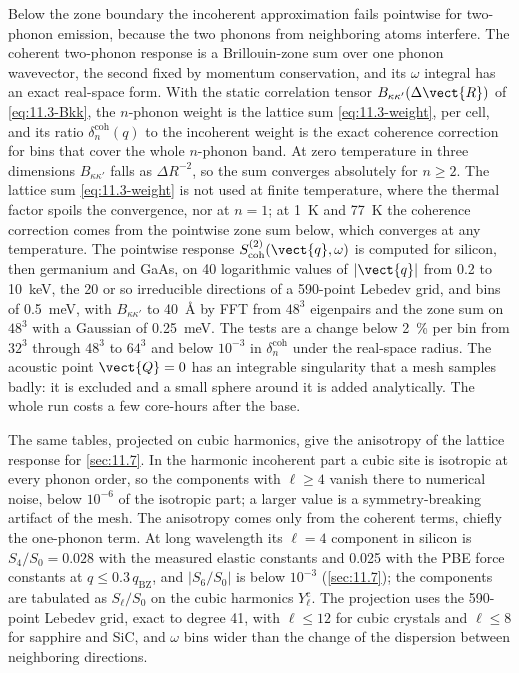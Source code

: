Below the zone boundary the incoherent approximation fails pointwise for two-phonon emission, because the two phonons from neighboring atoms interfere. The coherent two-phonon response is a Brillouin-zone sum over one phonon wavevector, the second fixed by momentum conservation, and its $\omega$ integral has an exact real-space form. With the static correlation tensor $B_{\kappa\kappa'}(\Delta\vect{R})$ of \cref{eq:11.3-Bkk}, the $n$-phonon weight is the lattice sum \cref{eq:11.3-weight}, per cell, and its ratio $\delta^{\mathrm{coh}}_n(q)$ to the incoherent weight is the exact coherence correction for bins that cover the whole $n$-phonon band. At zero temperature in three dimensions $B_{\kappa\kappa'}$ falls as $\Delta R^{-2}$, so the sum converges absolutely for $n \ge 2$. The lattice sum \cref{eq:11.3-weight} is not used at finite temperature, where the thermal factor spoils the convergence, nor at $n = 1$; at \SI{1}{K} and \SI{77}{K} the coherence correction comes from the pointwise zone sum below, which converges at any temperature. The pointwise response $S^{(2)}_{\mathrm{coh}}(\vect{q},\omega)$ is computed for silicon, then germanium and GaAs, on 40 logarithmic values of $|\vect{q}|$ from 0.2 to \SI{10}{keV}, the 20 or so irreducible directions of a 590-point Lebedev grid, and bins of \SI{0.5}{meV}, with $B_{\kappa\kappa'}$ to \SI{40}{\angstrom} by FFT from $48^3$ eigenpairs and the zone sum on $48^3$ with a Gaussian of \SI{0.25}{meV}. The tests are a change below \SI{2}{\percent} per bin from $32^3$ through $48^3$ to $64^3$ and below $10^{-3}$ in $\delta^{\mathrm{coh}}_n$ under the real-space radius. The acoustic point $\vect{Q} = 0$ has an integrable singularity that a mesh samples badly: it is excluded and a small sphere around it is added analytically. The whole run costs a few core-hours after the base.

The same tables, projected on cubic harmonics, give the anisotropy of the lattice response for \cref{sec:11.7}. In the harmonic incoherent part a cubic site is isotropic at every phonon order, so the components with $\ell \ge 4$ vanish there to numerical noise, below $10^{-6}$ of the isotropic part; a larger value is a symmetry-breaking artifact of the mesh. The anisotropy comes only from the coherent terms, chiefly the one-phonon term. At long wavelength its $\ell = 4$ component in silicon is $S_4/S_0 = 0.028$ with the measured elastic constants and 0.025 with the PBE force constants at $q \le 0.3\,q_{\mathrm{BZ}}$, and $|S_6/S_0|$ is below $10^{-3}$ (\cref{sec:11.7}); the components are tabulated as $S_\ell/S_0$ on the cubic harmonics $Y^{\mathrm{c}}_\ell$. The projection uses the 590-point Lebedev grid, exact to degree 41, with $\ell \le 12$ for cubic crystals and $\ell \le 8$ for sapphire and SiC, and $\omega$ bins wider than the change of the dispersion between neighboring directions.

